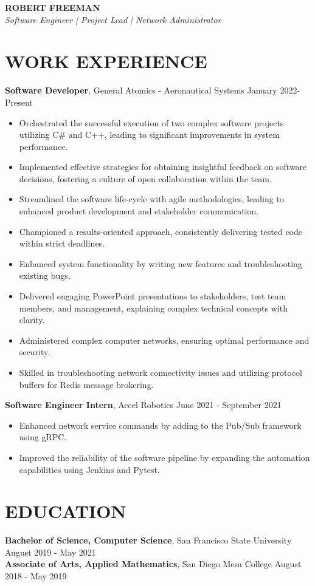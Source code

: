 \documentclass[a4paper,10pt]{article}
\begin{document}
\noindent
\textbf{\LARGE{ROBERT FREEMAN}}\\
\textit{Software Engineer | Project Lead | Network Administrator}

\section*{WORK EXPERIENCE}
\noindent
\textbf{Software Developer}, General Atomics - Aeronautical Systems \hfill January 2022- Present\\
\begin{itemize}
\item Orchestrated the successful execution of two complex software projects utilizing C\# and C++, leading to significant improvements in system performance.
\item Implemented effective strategies for obtaining insightful feedback on software decisions, fostering a culture of open collaboration within the team.
\item Streamlined the software life-cycle with agile methodologies, leading to enhanced product development and stakeholder communication.
\item Championed a results-oriented approach, consistently delivering tested code within strict deadlines.
\item Enhanced system functionality by writing new features and troubleshooting existing bugs.
\item Delivered engaging PowerPoint presentations to stakeholders, test team members, and management, explaining complex technical concepts with clarity.
\item Administered complex computer networks, ensuring optimal performance and security.
\item Skilled in troubleshooting network connectivity issues and utilizing protocol buffers for Redis message brokering.
\end{itemize}

\noindent
\textbf{Software Engineer Intern}, Accel Robotics \hfill June 2021 - September 2021\\
\begin{itemize}
\item Enhanced network service commands by adding to the Pub/Sub framework using gRPC.
\item Improved the reliability of the software pipeline by expanding the automation capabilities using Jenkins and Pytest.
\end{itemize}

\section*{EDUCATION}
\noindent
\textbf{Bachelor of Science, Computer Science}, San Francisco State University \hfill August 2019 - May 2021\\
\textbf{Associate of Arts, Applied Mathematics}, San Diego Mesa College \hfill August 2018 - May 2019
\end{document}
